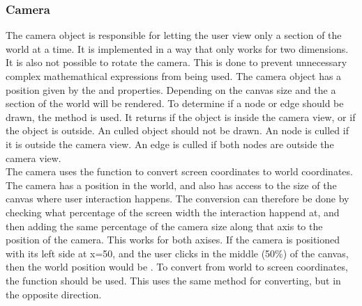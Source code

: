 \subsubsection{Camera}
The camera object is responsible for letting the user view only a section of the world at a time. It is implemented in a way that only works for two dimensions. It is also not possible to rotate the camera. This is done to prevent unnecessary complex mathemathical expressions from being used. The camera object has a position given by the  and  properties. Depending on the canvas size and the  a section of the world will be rendered. To determine if a node or edge should be drawn, the  method is used. It returns  if the object is inside the camera view, or  if the object is outside. An culled object should not be drawn. An node is culled if it is outside the camera view. An edge is culled if both nodes are outside the camera view.
\\[11pt]
The camera uses the  function to convert screen coordinates to world coordinates. The camera has a position in the world, and also has access to the size of the canvas where user interaction happens. The conversion can therefore be done by checking what percentage of the screen width the interaction happend at, and then adding the same percentage of the camera size along that axis to the position of the camera. This works for both axises. If the camera is positioned with its left side at x=50, and the user clicks in the middle (50\%) of the canvas, then the world position would be . To convert from world to screen coordinates, the  function should be used. This uses the same method for converting, but in the opposite direction.
